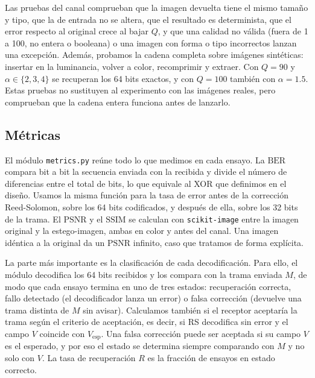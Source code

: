 \documentclass[IB]{TFUOC}%
\begin{document}
Las pruebas del canal comprueban que la imagen devuelta tiene el mismo tamaño y tipo, que la de 
entrada no se altera, que el resultado es determinista, que el error respecto al original crece 
al bajar $Q$, y que una calidad no válida (fuera de 1 a 100, no entera o booleana) o una imagen 
con forma o tipo incorrectos lanzan una excepción. Además, probamos la cadena completa sobre 
imágenes sintéticas: insertar en la luminancia, volver a color, recomprimir y extraer. 
Con $Q=90$ y $\alpha \in \{2, 3, 4\}$ se recuperan los 64 bits exactos, y con $Q=100$ también 
con $\alpha=1{.}5$. Estas pruebas no sustituyen al experimento con las imágenes reales, pero 
comprueban que la cadena entera funciona antes de lanzarlo.

\subsection{Métricas}
\label{subsec:impl_metrics}

El módulo \texttt{metrics.py} reúne todo lo que medimos en cada ensayo. La $\mathrm{BER}$ compara bit a bit 
la secuencia enviada con la recibida y divide el número de diferencias 
entre el total de bits, lo que equivale al XOR que definimos en el diseño. 
Usamos la misma función para la tasa de error antes de la corrección Reed-Solomon, sobre los 64 
bits codificados, y después de ella, sobre los 32 bits de la trama. 
El $\mathrm{PSNR}$ y el $\mathrm{SSIM}$ se calculan con \texttt{scikit-image} entre la imagen 
original y la estego-imagen, ambas en color y antes del canal. Una imagen idéntica a la original da 
un $\mathrm{PSNR}$ infinito, caso que tratamos de forma explícita.

La parte más importante es la clasificación de cada decodificación. Para ello, el módulo decodifica 
los 64 bits recibidos y los compara con la trama enviada $M$, de modo que cada ensayo termina en 
uno de tres estados: recuperación correcta, fallo detectado (el decodificador lanza un error) o 
falsa corrección (devuelve una trama distinta de $M$ sin avisar). Calculamos también si el 
receptor aceptaría la trama según el criterio de aceptación, es decir, si RS decodifica sin error y 
el campo $V$ coincide con $V_{\mathrm{esp}}$. Una falsa corrección puede ser aceptada si su 
campo $V$ es el esperado, y por eso el estado se determina siempre comparando con $M$ y no solo 
con $V$. La tasa de recuperación $R$ es la fracción de ensayos en estado correcto.
\end{document}

